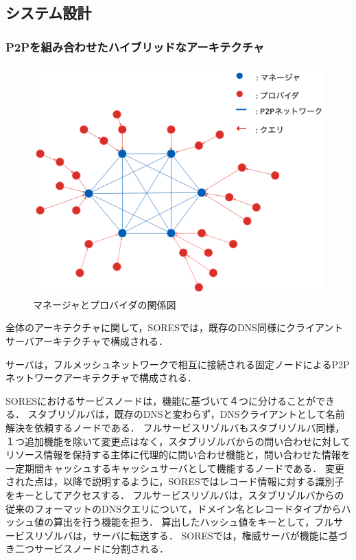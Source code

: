 \subsection{システム設計}
\subsubsection{P2Pを組み合わせたハイブリッドなアーキテクチャ}

\begin{figure}[bh]
 \centering
 \includegraphics[scale=0.5]{figure/manager-provider.png}
 \caption{マネージャとプロバイダの関係図}
 \label{fig:manager-provider}
\end{figure}

全体のアーキテクチャに関して，SORESでは，既存のDNS同様にクライアントサーバアーキテクチャで構成される．

サーバは，フルメッシュネットワークで相互に接続される固定ノードによるP2Pネットワークアーキテクチャで構成される．

SORESにおけるサービスノードは，機能に基づいて４つに分けることができる．
スタブリゾルバは，既存のDNSと変わらず，DNSクライアントとして名前解決を依頼するノードである．
フルサービスリゾルバもスタブリゾルバ同様，１つ追加機能を除いて変更点はなく，スタブリゾルバからの問い合わせに対してリソース情報を保持する主体に代理的に問い合わせ機能と，問い合わせた情報を一定期間キャッシュするキャッシュサーバとして機能するノードである．
変更された点は，以降で説明するように，SORESではレコード情報に対する識別子をキーとしてアクセスする．
フルサービスリゾルバは，スタブリゾルバからの従来のフォーマットのDNSクエリについて，ドメイン名とレコードタイプからハッシュ値の算出を行う機能を担う．
算出したハッシュ値をキーとして，フルサービスリゾルバは，サーバに転送する．
SORESでは，権威サーバが機能に基づき二つサービスノードに分割される．

